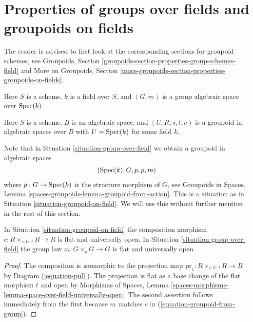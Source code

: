 \section{Properties of groups over fields and groupoids on fields}
\label{section-properties-groupoids-on-fields}

\noindent
The reader is advised to first look at the corresponding sections for
groupoid schemes, see
Groupoids, Section \ref{groupoids-section-properties-group-schemes-field}
and
More on Groupoids,
Section \ref{more-groupoids-section-properties-groupoids-on-fields}.

\begin{situation}
\label{situation-group-over-field}
Here $S$ is a scheme, $k$ is a field over $S$, and
$(G, m)$ is a group algebraic space over $\mathop{\mathrm{Spec}}(k)$.
\end{situation}

\begin{situation}
\label{situation-groupoid-on-field}
Here $S$ is a scheme, $B$ is an algebraic space, and
$(U, R, s, t, c)$ is a groupoid in algebraic spaces over $B$
with $U = \mathop{\mathrm{Spec}}(k)$ for some field $k$.
\end{situation}

\noindent
Note that in
Situation \ref{situation-group-over-field}
we obtain a groupoid in algebraic spaces
\begin{equation}
\label{equation-groupoid-from-group}
(\mathop{\mathrm{Spec}}(k), G, p, p, m)
\end{equation}
where $p : G \to \mathop{\mathrm{Spec}}(k)$ is the structure morphism of $G$, see
Groupoids in Spaces, Lemma \ref{spaces-groupoids-lemma-groupoid-from-action}.
This is a situation as in
Situation \ref{situation-groupoid-on-field}.
We will use this without further mention in the rest of this section.

\begin{lemma}
\label{lemma-groupoid-on-field-open-multiplication}
In
Situation \ref{situation-groupoid-on-field}
the composition morphism $c : R \times_{s, U, t} R \to R$ is flat and
universally open.
In
Situation \ref{situation-group-over-field}
the group law $m : G \times_k G \to G$ is flat and
universally open.
\end{lemma}

\begin{proof}
The composition is isomorphic to the projection map
$\text{pr}_1 : R \times_{t, U, t} R \to R$ by
Diagram (\ref{equation-pull}).
The projection is flat as a base change of the flat morphism $t$
and open by
Morphisms of Spaces,
Lemma \ref{spaces-morphisms-lemma-space-over-field-universally-open}.
The second assertion follows immediately from the first because
$m$ matches $c$ in (\ref{equation-groupoid-from-group}).
\end{proof}

